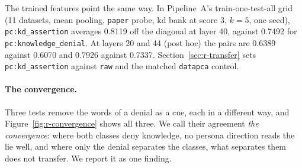 The trained features point the same way. %
In Pipeline~A's train-one-test-all grid (11 datasets, mean pooling, \texttt{paper} probe, kd bank at score 3, $k=5$, one seed), \texttt{pc:kd\_assertion} averages 0.8119 off the diagonal at layer 40, against 0.7492 for \texttt{pc:knowledge\_denial}. %
At layers 20 and 44 (post hoc) the pairs are 0.6389 against 0.6070 and 0.7926 against 0.7337. %
Section~\ref{sec:r-transfer} sets \texttt{pc:kd\_assertion} against \texttt{raw} and the matched \texttt{datapca} control.

\paragraph{The convergence.}
Three tests remove the words of a denial as a cue, each in a different way, and Figure~\ref{fig:r-convergence} shows all three. %
We call their agreement \emph{the convergence}: where both classes deny knowledge, no persona direction reads the lie well, and where only the denial separates the classes, what separates them does not transfer. %
We report it as one finding.

